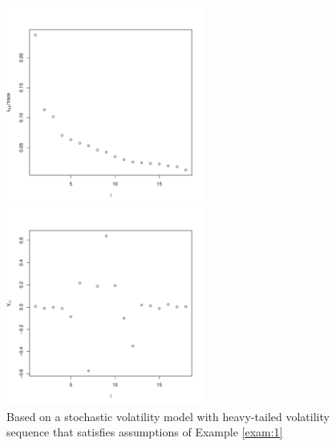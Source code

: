 \begin{figure}
  \centering
  \begin{minipage}{0.48\linewidth}
    \includegraphics[width=6.5cm]{LightTailedCase1_eigenvalues.pdf}
  \end{minipage}
  \begin{minipage}{0.48\linewidth}
    \includegraphics[width=6.5cm]{LightTailedCase1_eigenvector1.pdf}    
  \end{minipage}
  \caption{Based on a stochastic volatility model with heavy-tailed
    volatility sequence that satisfies assumptions of Example
    \ref{exam:1}}
  \label{eigen:model2}
\end{figure}

